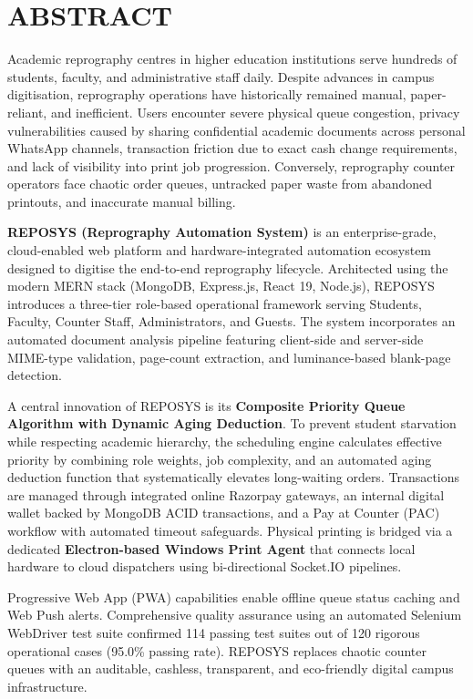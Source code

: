 \documentclass[12pt,a4paper,oneside]{report}
\begin{document}
\chapter*{ABSTRACT}
Academic reprography centres in higher education institutions serve hundreds of students, faculty, and administrative staff daily. Despite advances in campus digitisation, reprography operations have historically remained manual, paper-reliant, and inefficient. Users encounter severe physical queue congestion, privacy vulnerabilities caused by sharing confidential academic documents across personal WhatsApp channels, transaction friction due to exact cash change requirements, and lack of visibility into print job progression. Conversely, reprography counter operators face chaotic order queues, untracked paper waste from abandoned printouts, and inaccurate manual billing.

\textbf{REPOSYS (Reprography Automation System)} is an enterprise-grade, cloud-enabled web platform and hardware-integrated automation ecosystem designed to digitise the end-to-end reprography lifecycle. Architected using the modern MERN stack (MongoDB, Express.js, React 19, Node.js), REPOSYS introduces a three-tier role-based operational framework serving Students, Faculty, Counter Staff, Administrators, and Guests. The system incorporates an automated document analysis pipeline featuring client-side and server-side MIME-type validation, page-count extraction, and luminance-based blank-page detection. 

A central innovation of REPOSYS is its \textbf{Composite Priority Queue Algorithm with Dynamic Aging Deduction}. To prevent student starvation while respecting academic hierarchy, the scheduling engine calculates effective priority by combining role weights, job complexity, and an automated aging deduction function that systematically elevates long-waiting orders. Transactions are managed through integrated online Razorpay gateways, an internal digital wallet backed by MongoDB ACID transactions, and a Pay at Counter (PAC) workflow with automated timeout safeguards. Physical printing is bridged via a dedicated \textbf{Electron-based Windows Print Agent} that connects local hardware to cloud dispatchers using bi-directional Socket.IO pipelines.

Progressive Web App (PWA) capabilities enable offline queue status caching and Web Push alerts. Comprehensive quality assurance using an automated Selenium WebDriver test suite confirmed 114 passing test suites out of 120 rigorous operational cases (95.0\% passing rate). REPOSYS replaces chaotic counter queues with an auditable, cashless, transparent, and eco-friendly digital campus infrastructure.
\end{document}
